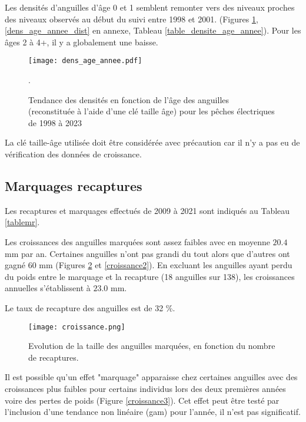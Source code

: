 \documentclass[10pt,twocolumn,titlepage,twoside]{article}\usepackage[]{graphicx}\usepackage[]{color}
\begin{document}
    
\small

\normalsize

Les densités d'anguilles d'âge 0 et 1 semblent remonter vers des
niveaux proches des niveaux observés au début du suivi entre 1998 et 2001. 
 (Figures \ref{dens_age_annee},
\ref{dens_age_annee_dist} en annexe, Tableau \ref{table_densite_age_annee}).
Pour les âges 2 à 4+, il y a globalement une baisse.

\begin{figure}[htbp]
\centering
\texttt{[image: dens\_age\_annee.pdf]}
\caption[Densité par âge.]{Tendance des densités en fonction de
l'âge des anguilles (reconstituée à l'aide d'une clé taille âge) pour
les pêches électriques de 1998 à 2023 \footnotemark}.
\label{dens_age_annee}
\end{figure}


La clé taille-âge utilisée doit être considérée avec précaution car il n'y a pas eu de
vérification des données de croissance.
\subsection{Marquages recaptures}

Les recaptures et marquages effectués de 2009 à 2021 sont indiqués au Tableau
\ref{tablemr}.

Les croissances des anguilles marquées sont
assez faibles avec en moyenne $20.4$ mm par an. Certaines anguilles
n'ont pas grandi du tout alors que
d'autres ont gagné 60 mm (Figures \ref{croissance} et \ref{croissance2}). En
excluant les anguilles ayant perdu du poids entre le marquage et la recapture
(18 anguilles sur
138), les croissances annuelles s'établissent à
$23.0$ mm.

Le taux de recapture des anguilles est de
32 \%.

\begin{figure}[htbp]
\centering
\texttt{[image: croissance.png]}
\caption[Taille anguilles marquées]{Evolution de la taille des anguilles
marquées, en fonction du nombre de recaptures.}
\label{croissance}
\end{figure}
Il est possible qu'un effet "marquage" apparaisse chez certaines anguilles avec
des croissances plus faibles pour certains individus lors des deux premières
années voire des pertes de poids (Figure \ref{croissance3}). Cet effet peut
être testé par l'inclusion d'une tendance non linéaire (gam) pour l'année, il
n'est pas significatif.
\end{document}
